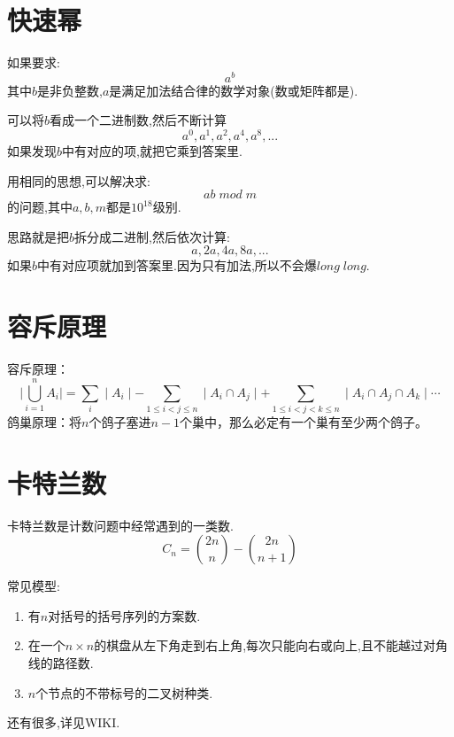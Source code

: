 \documentclass{beamer}
\begin{document}
	\section{快速幂}
		\begin{frame}
			如果要求:
			$$
				a^b 
			$$
			其中$b$是非负整数,$a$是满足加法结合律的数学对象(数或矩阵都是).
			
			\pause 
			
			可以将$b$看成一个二进制数,然后不断计算
			$$
				a^0, a^1, a^2,a^4,a^8,...
			$$
			如果发现$b$中有对应的项,就把它乘到答案里.
		\end{frame}
		\begin{frame}
			用相同的思想,可以解决求:
			$$
				ab \; mod \; m
			$$
			的问题,其中$a, b, m$都是$10^{18}$级别.
			
			\pause
			
			思路就是把$b$拆分成二进制,然后依次计算:
			$$
			a,2a,4a,8a,...
			$$
			如果$b$中有对应项就加到答案里.因为只有加法,所以不会爆$long\;long$.
		\end{frame}
	\section{容斥原理}
		\begin{frame}
			容斥原理：
			$$
			\mid \bigcup_{i = 1}^{n} A_i\mid = \sum_{i} \mid  A_i \mid - \sum_{1 \leq i < j \leq n} \mid A_i \cap A_j \mid + \sum_{1 \leq i < j < k \leq n} \mid A_i \cap A_j \cap A_k \mid \cdots 
			$$
			鸽巢原理：将$n$个鸽子塞进$n-1$个巢中，那么必定有一个巢有至少两个鸽子。
		\end{frame}
	\section{卡特兰数}
		\begin{frame}
			卡特兰数是计数问题中经常遇到的一类数.
			$$
				C_n = \binom{2n}{n} - \binom{2n}{n+1}
			$$
			
			\pause
			
			常见模型:
			\begin{enumerate}
				\item 有$n$对括号的括号序列的方案数.
				\item 在一个$n \times n$的棋盘从左下角走到右上角,每次只能向右或向上,且不能越过对角线的路径数.
				\item $n$个节点的不带标号的二叉树种类.
			\end{enumerate}
			还有很多,详见WIKI.
		\end{frame}
\end{document}
